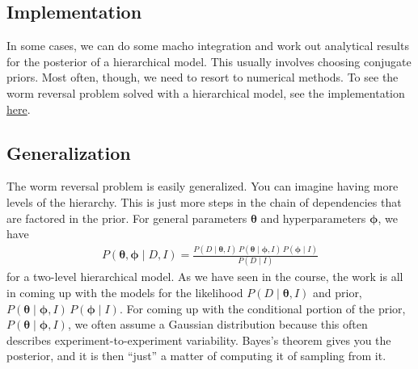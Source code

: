 \subsection{Implementation}
In some cases, we can do some macho integration and work out
analytical results for the posterior of a hierarchical model.  This
usually involves choosing conjugate priors.  Most often, though, we
need to resort to numerical methods.  To see the worm reversal problem
solved with a hierarchical model, see the implementation
\href{http://bebi103.caltech.edu/2015/tutorials/l08_hierarchical_models.html}{here}.


\subsection{Generalization}
The worm reversal problem is easily generalized.  You can imagine
having more levels of the hierarchy.  This is just more steps in the
chain of dependencies that are factored in the prior.  For general
parameters $\boldsymbol{\theta}$ and hyperparameters
$\boldsymbol{\phi}$, we have
\begin{align}
P(\boldsymbol{\theta}, \boldsymbol{\phi} \mid D, I) = \frac{P(D\mid \boldsymbol{\theta}, I)\, P(\boldsymbol{\theta} \mid \boldsymbol{\phi}, I)\,P(\boldsymbol{\phi}\mid I)}
{P(D\mid I)}
\end{align}
for a two-level hierarchical model.  As we have seen in the course,
the work is all in coming up with the models for the likelihood
$P(D\mid \boldsymbol{\theta}, I)$ and prior,
$P(\boldsymbol{\theta} \mid \boldsymbol{\phi},
I)\,P(\boldsymbol{\phi}\mid I)$.
For coming up with the conditional portion of the prior,
$P(\boldsymbol{\theta} \mid \boldsymbol{\phi}, I)$, we often assume a
Gaussian distribution because this often describes
experiment-to-experiment variability.  Bayes's theorem gives you the
posterior, and it is then ``just'' a matter of computing it of
sampling from it.

